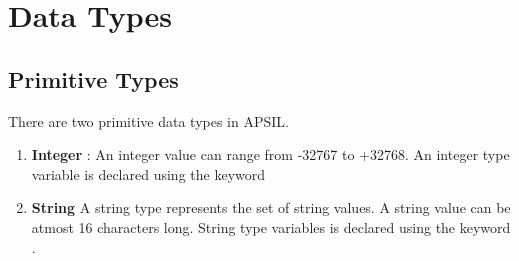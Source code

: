 \documentclass[11pt]{article}
\begin{document}
\section{Data Types}

\subsection{Primitive Types}
There are two primitive data types in APSIL. 
\begin{enumerate}

\item \textbf{Integer} : An integer value can range from -32767 to +32768. An integer type variable is declared using the keyword 
\item \textbf{String}  
A string type represents the set of string values. A string value can be atmost 16 characters long. String type variables is declared using the keyword .
\end{enumerate}
\end{document}

